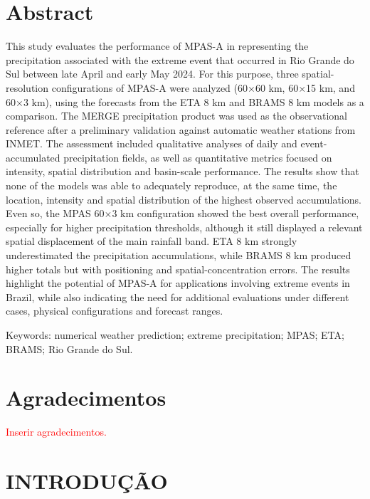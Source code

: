 \documentclass[12pt,a4paper,oneside]{book}
\begin{document}
\chapter*{Abstract}
This study evaluates the performance of MPAS-A in representing the precipitation associated with the extreme event that occurred in Rio Grande do Sul between late April and early May 2024. For this purpose, three spatial-resolution configurations of MPAS-A were analyzed (60$\times$60 km, 60$\times$15 km, and 60$\times$3 km), using the forecasts from the ETA 8 km and BRAMS 8 km models as a comparison. The MERGE precipitation product was used as the observational reference after a preliminary validation against automatic weather stations from INMET. The assessment included qualitative analyses of daily and event-accumulated precipitation fields, as well as quantitative metrics focused on intensity, spatial distribution and basin-scale performance. The results show that none of the models was able to adequately reproduce, at the same time, the location, intensity and spatial distribution of the highest observed accumulations. Even so, the MPAS 60$\times$3 km configuration showed the best overall performance, especially for higher precipitation thresholds, although it still displayed a relevant spatial displacement of the main rainfall band. ETA 8 km strongly underestimated the precipitation accumulations, while BRAMS 8 km produced higher totals but with positioning and spatial-concentration errors. The results highlight the potential of MPAS-A for applications involving extreme events in Brazil, while also indicating the need for additional evaluations under different cases, physical configurations and forecast ranges.

\bigskip
\noindent Keywords: numerical weather prediction; extreme precipitation; MPAS; ETA; BRAMS; Rio Grande do Sul.

\chapter*{Agradecimentos}
\textcolor{red}{Inserir agradecimentos.}

\listoffigures
{}

\listoftables
{}

\tableofcontents
\clearpage
{}

\chapter{INTRODUÇÃO}
\end{document}
